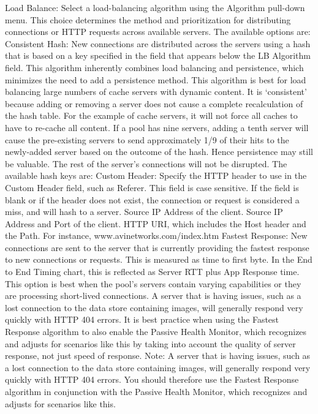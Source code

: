 \documentclass[letterpaper,10pt,english]{sphinxmanual}
\begin{document}
Load Balance: Select a load-balancing algorithm using the Algorithm pull-down menu. This choice determines the method and prioritization for distributing connections or HTTP requests across available servers. The available options are:
Consistent Hash: New connections are distributed across the servers using a hash that is based on a key specified in the field that appears below the LB Algorithm field. This algorithm inherently combines load balancing and persistence, which minimizes the need to add a persistence method. This algorithm is best for load balancing large numbers of cache servers with dynamic content. It is ‘consistent’ because adding or removing a server does not cause a complete recalculation of the hash table. For the example of cache servers, it will not force all caches to have to re-cache all content. If a pool has nine servers, adding a tenth server will cause the pre-existing servers to send approximately 1/9 of their hits to the newly-added server based on the outcome of the hash. Hence persistence may still be valuable. The rest of the server's connections will not be disrupted. The available hash keys are:
Custom Header: Specify the HTTP header to use in the Custom Header field, such as Referer. This field is case sensitive. If the field is blank or if the header does not exist, the connection or request is considered a miss, and will hash to a server.
Source IP Address of the client.
Source IP Address and Port of the client.
HTTP URI, which includes the Host header and the Path. For instance, www.avinetworks.com/index.htm
Fastest Response: New connections are sent to the server that is currently providing the fastest response to new connections or requests. This is measured as time to first byte. In the End to End Timing chart, this is reflected as Server RTT plus App Response time. This option is best when the pool’s servers contain varying capabilities or they are processing short-lived connections. A server that is having issues, such as a lost connection to the data store containing images, will generally respond very quickly with HTTP 404 errors. It is best practice when using the Fastest Response algorithm to also enable the Passive Health Monitor, which recognizes and adjusts for scenarios like this by taking into account the quality of server response, not just speed of response.
Note: A server that is having issues, such as a lost connection to the data store containing images, will generally respond very quickly with HTTP 404 errors. You should therefore use the Fastest Response algorithm in conjunction with the Passive Health Monitor, which recognizes and adjusts for scenarios like this.
\end{document}
